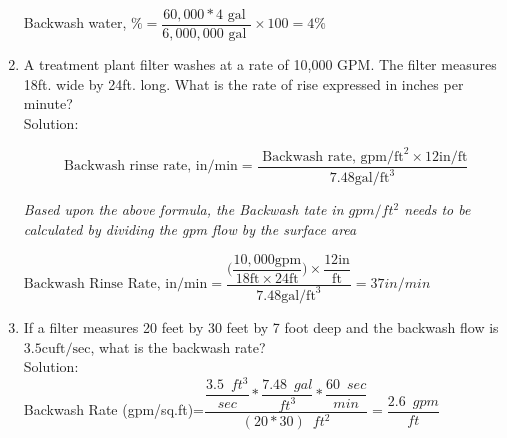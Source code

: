 \begin{enumerate}
Backwash water, $\%=\dfrac{60,000*4 \text { gal }}{6,000,000 \text { gal }} \times 100 = \boxed{4 \%}$\\
\vspace{0.3cm}
\item A treatment plant filter washes at a rate of 10,000 GPM. The filter measures 18ft. wide by 24ft. long. What is the rate of rise expressed in inches per minute?\\
\vspace{0.2cm}
Solution:\\
\vspace{0.2cm}

$$\text{ Backwash rinse rate, in/} \mathrm{min}=\frac{\text { Backwash rate, } \mathrm{gpm} / \mathrm{ft}^{2} \times 12 \mathrm{in} / \mathrm{ft}}{7.48 \mathrm{gal} / \mathrm{ft}^{3}}$$

\textit{Based upon the above formula, the Backwash tate in $gpm/ft^2$ needs to be calculated by dividing the gpm flow by the surface area}

$\text{Backwash Rinse Rate, in/} \mathrm{min}=
\dfrac{\Biggl(\dfrac{10,000 \mathrm{gpm}}{18 \mathrm{ft} \times 24 \mathrm{ft}}\Biggr) \times \dfrac{12 \mathrm{in}}{\mathrm{ft}}
}
{
7.48 \mathrm{gal} / \mathrm{ft}^{3}
}=\boxed{37in/min}$\\
\vspace{0.3cm}
\item If a filter measures 20 feet by 30 feet by 7 foot deep and the backwash flow is $3.5 \mathrm{cuft} / \mathrm{sec}$, what is the backwash rate?\\
\vspace{0.2cm}
Solution:\\
\vspace{0.2cm}
Backwash Rate (gpm/sq.ft)=$\dfrac{\dfrac{3.5 \enspace ft^3}{sec}*\dfrac{7.48 \enspace gal}{ft^3}*\dfrac{60 \enspace sec}{min}}{(20*30) \enspace ft^2}=\boxed{\dfrac{2.6 \enspace gpm}{ft}}$

\end{enumerate}
